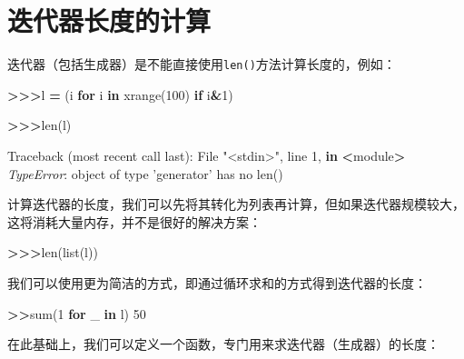 \documentclass[]{ctexbook}
\newenvironment{Shaded}{\begin{snugshade}}{\end{snugshade}}
\newcommand{\BuiltInTok}[1]{#1}
\newcommand{\ControlFlowTok}[1]{\textcolor[rgb]{0.13,0.29,0.53}{\textbf{#1}}}
\newcommand{\DecValTok}[1]{\textcolor[rgb]{0.00,0.00,0.81}{#1}}
\newcommand{\KeywordTok}[1]{\textcolor[rgb]{0.13,0.29,0.53}{\textbf{#1}}}
\newcommand{\NormalTok}[1]{#1}
\newcommand{\OperatorTok}[1]{\textcolor[rgb]{0.81,0.36,0.00}{\textbf{#1}}}
\newcommand{\PreprocessorTok}[1]{\textcolor[rgb]{0.56,0.35,0.01}{\textit{#1}}}
\newcommand{\StringTok}[1]{\textcolor[rgb]{0.31,0.60,0.02}{#1}}
\begin{document}
\hypertarget{ux8fedux4ee3ux5668ux957fux5ea6ux7684ux8ba1ux7b97}{%
\section{迭代器长度的计算}\label{ux8fedux4ee3ux5668ux957fux5ea6ux7684ux8ba1ux7b97}}

迭代器（包括生成器）是不能直接使用\texttt{len()}方法计算长度的，例如：

\begin{Shaded}
\begin{Highlighting}[]
\OperatorTok{>>>}\NormalTok{l }\OperatorTok{=}\NormalTok{ (i }\ControlFlowTok{for}\NormalTok{ i }\KeywordTok{in} \BuiltInTok{xrange}\NormalTok{(}\DecValTok{100}\NormalTok{) }\ControlFlowTok{if}\NormalTok{ i}\OperatorTok{&}\DecValTok{1}\NormalTok{)}

\OperatorTok{>>>}\BuiltInTok{len}\NormalTok{(l)}

\NormalTok{Traceback (most recent call last):}
\NormalTok{File }\StringTok{"<stdin>"}\NormalTok{, line }\DecValTok{1}\NormalTok{, }\KeywordTok{in} \OperatorTok{<}\NormalTok{module}\OperatorTok{>}
\PreprocessorTok{TypeError}\NormalTok{: }\BuiltInTok{object}\NormalTok{ of }\BuiltInTok{type} \StringTok{'generator'}\NormalTok{ has no }\BuiltInTok{len}\NormalTok{()}
\end{Highlighting}
\end{Shaded}

计算迭代器的长度，我们可以先将其转化为列表再计算，但如果迭代器规模较大，这将消耗大量内存，并不是很好的解决方案：

\begin{Shaded}
\begin{Highlighting}[]
\OperatorTok{>>>}\BuiltInTok{len}\NormalTok{(}\BuiltInTok{list}\NormalTok{(l))}
\end{Highlighting}
\end{Shaded}

我们可以使用更为简洁的方式，即通过循环求和的方式得到迭代器的长度：

\begin{Shaded}
\begin{Highlighting}[]
\OperatorTok{>>}\BuiltInTok{sum}\NormalTok{(}\DecValTok{1} \ControlFlowTok{for}\NormalTok{ _ }\KeywordTok{in}\NormalTok{ l)}
\DecValTok{50}
\end{Highlighting}
\end{Shaded}

在此基础上，我们可以定义一个函数，专门用来求迭代器（生成器）的长度：
\end{document}
